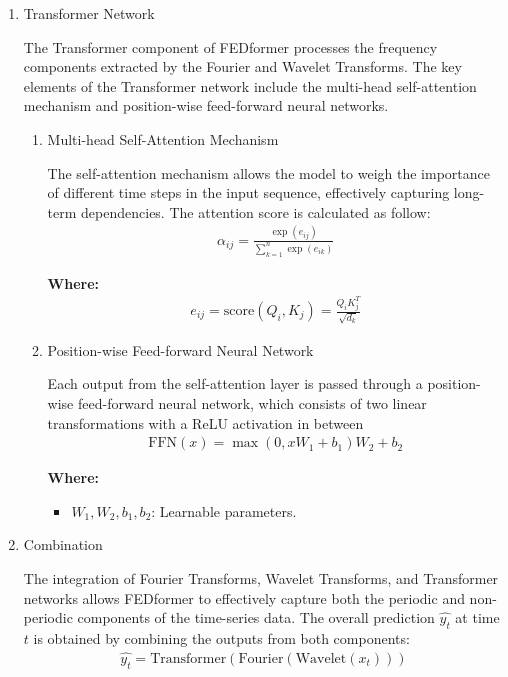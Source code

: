 \documentclass[conference]{IEEEtran}
\begin{document}
\begin{enumerate}
\begin{enumerate}
    \end{enumerate}
    
    \item Transformer Network
    
    The Transformer component of FEDformer processes the frequency components extracted by the Fourier and Wavelet Transforms. The key elements of the Transformer network include the multi-head self-attention mechanism and position-wise feed-forward neural networks.
    
        \begin{enumerate}
            \item Multi-head Self-Attention Mechanism
            
            The self-attention mechanism allows the model to weigh the importance of different time steps in the input sequence, effectively capturing long-term dependencies. The attention score is calculated as follow:
            \begin{align*}
                \alpha_{ij} = \frac{\exp(e_{ij})}{\sum_{k=1}^{n} \exp(e_{ik})}
            \end{align*}

            \textbf{Where:}
            \begin{align*}
                e_{ij} = \text{score}(Q_i, K_j) = \frac{Q_i K_j^T}{\sqrt{d_k}}
            \end{align*}
            
            \item Position-wise Feed-forward Neural Network

            Each output from the self-attention layer is passed through a position-wise feed-forward neural network, which consists of two linear transformations with a ReLU activation in between
            \begin{align*}
                \text{FFN}(x) = \max(0, xW_1 + b_1)W_2 + b_2
            \end{align*}
            
            \textbf{Where:}
            \begin{itemize}
                \item $W_1, W_2, b_1, b_2$: Learnable parameters.
            \end{itemize}
            
        \end{enumerate}
        
    \item Combination

    The integration of Fourier Transforms, Wavelet Transforms, and Transformer networks allows FEDformer to effectively capture both the periodic and non-periodic components of the time-series data. The overall prediction $\hat{y_t}$ at time $t$ is obtained by combining the outputs from both components:
    \begin{align*}
        \hat{y_t} = \text{Transformer}(\text{Fourier}(\text{Wavelet}(x_t)))
    \end{align*}
    
\end{enumerate}
\end{document}
